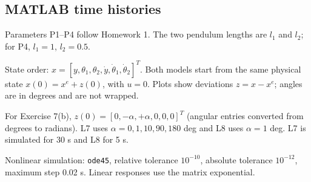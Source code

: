 \subsection*{MATLAB time histories}
Parameters P1--P4 follow Homework 1. The two pendulum lengths are $l_1$ and $l_2$; for P4, $l_1=1$, $l_2=0.5$.

State order: $x=[y,\theta_1,\theta_2,\dot y,\dot\theta_1,\dot\theta_2]^T$. Both models start from the same physical state $x(0)=x^e+z(0)$, with $u=0$. Plots show deviations $z=x-x^e$; angles are in degrees and are not wrapped.

For Exercise 7(b), $z(0)=[0,-\alpha,+\alpha,0,0,0]^T$ (angular entries converted from degrees to radians). L7 uses $\alpha=0,1,10,90,180$ deg and L8 uses $\alpha=1$ deg. L7 is simulated for 30 s and L8 for 5 s.

Nonlinear simulation: \texttt{ode45}, relative tolerance $10^{-10}$, absolute tolerance $10^{-12}$, maximum step 0.02 s. Linear responses use the matrix exponential.






